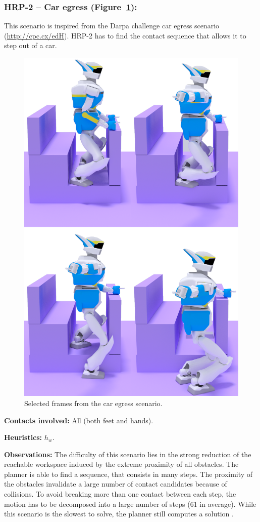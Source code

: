 \subsubsection{HRP-2 -- Car egress (Figure~\ref{fig:car}):}
This scenario is inspired from the Darpa challenge car egress scenario (\url{http://cpc.cx/edH}). HRP-2 has 
to find the contact sequence that allows it to step out of a car.

\begin{figure}
  \centering
  \includegraphics[width=0.5\linewidth]{figures/car}
  \caption{
           Selected frames from the car egress scenario. }
		   \label{fig:car}
\end{figure}


\noindent\textbf{Contacts involved:} All (both feet and hands).

\noindent\textbf{Heuristics:} $h_w$.

\noindent\textbf{Observations:} The difficulty of this scenario lies in the strong reduction of the reachable workspace induced 
by the extreme proximity of all obstacles. The planner is able to find a sequence, that consists in many steps.
The proximity of the obstacles invalidate a large number of contact candidates because of collisions. To avoid breaking more than one contact between each step, the motion has to be decomposed into a large number of steps (61 in average).
While this scenario is the slowest to solve, the planner still computes a solution .


